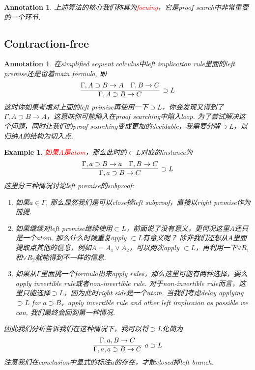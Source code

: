 \documentclass{article}
\theoremstyle{plain}
\newtheorem{example}[theorem]{Example}
\newtheorem{annotation}[theorem]{Annotation}
\theoremstyle{nonumberplain}
\newcommand{\redt}[1]{\textcolor{red}{#1}}
\begin{document}
\begin{annotation}
\rm 上述算法的核心我们称其为\redt{focuing}，它是proof search中非常重要的一个环节. 
\end{annotation}


\newpage
\subsection{Contraction-free}

\begin{annotation}
\rm 在simplified sequent calculus中left implication rule里面的left premise还是留着main formula, 即
$$
\infer[\supset L]{\Gamma, A \supset B \to C}{\Gamma, A \supset B \to A & \Gamma, B \to C}
$$
这时你如果考虑对上面的left primise再使用一下$\supset L$，你会发现又得到了$\Gamma, A \supset B \to A$，这意味你可能陷入在proof searching中陷入loop. 为了尝试解决这个问题，同时让我们的proof searching变成更加的decidable，我需要分解$\supset L$，以归纳$A$的结构为切入点.
\end{annotation}

\begin{example}
\rm \redt{如果$A$是atom}，那么此时的$\subset L$对应的instance为
$$
\infer[\supset L]{\Gamma, a \supset B \to C}{\Gamma, a \supset B \to a & \Gamma, B \to C}
$$
这里分三种情况讨论left premise的subproof:
\begin{enumerate}
	\item 如果$a \in \Gamma$, 那么显然我们是可以close掉left subproof，直接以right premise作为前提. 
	\item 如果继续对left premise继续使用$\subset L$，前面说了没有意义，更何况这里$A$还只是一个atom.  那么什么时候重复apply $\subset L$有意义呢？ 除非我们还想从$A$里面提取点其他的信息，例如$A = A_1 \vee A_2$，可以两次apply $\subset L$，再利用一下$\vee R_1$和$\vee R_2$就能得到不一样的信息.
	\item 如果从$\Gamma$里面挑一个formula出来apply rules，那么这里可能有两种选择，要么apply invertible rule或者non-invertible rule. 对于non-invertible rule而言，这里只能选择$\supset L$，因为此时right side是一个atom. 当我们考虑delay applying $\supset L$ for $a \supset B$，apply invertible rule and other left implicaion as possible we can, 我们最终会回到第一种情况. 
\end{enumerate}
因此我们分析告诉我们在这种情况下，我可以将$\supset L$化简为
$$
\infer[a \supset L]{\Gamma,a,a \supset B \to C}{\Gamma,a, B \to C}
$$
注意我们在conclusion中显式的标注$a$的存在，才能closed掉left branch. 
\end{example}
\end{document}
